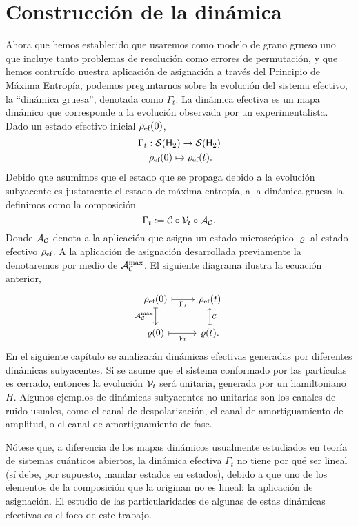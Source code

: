 \section{Construcción de la dinámica}\label{sec:ch2dycon}

Ahora que hemos establecido que usaremos como modelo de grano grueso uno que incluye tanto problemas de resolución como errores de permutación, y que hemos contruído nuestra aplicación de asignación a través del Principio de Máxima Entropía, podemos preguntarnos sobre la evolución del sistema efectivo, la ``dinámica gruesa'', denotada como $\Gamma_t$. La dinámica efectiva es un mapa dinámico que corresponde a la evolución observada por un experimentalista. Dado un estado efectivo inicial $\rho_{\text{ef}}(0)$,
\begin{gather*}
\Gamma_{t}:\mcS(\hilbert_2)\rightarrow \mcS(\hilbert_2)\\
\rho_{\ef}(0) \mapsto \rho_{\ef}(t)\rlap{.}
\end{gather*}
Debido que asumimos que el estado que se propaga debido a la evolución subyacente es justamente el estado de máxima entropía, a la dinámica gruesa la definimos como la composición
\begin{equation*}
\Gamma_t:=\mathcal{C} \circ \mathcal{V}_t \circ \mathcal{A}_{\mathcal{C}}.
\end{equation*}
Donde $\mathcal{A}_{\mathcal{C}}$ denota a la aplicación que asigna un estado microscópico $\varrho$ al estado efectivo $\rho_{\text{ef}}$. A la aplicación de asignación desarrollada previamente la denotaremos por medio de $\mathcal{A}_{\mathcal{C}}^{\max}$. El siguiente diagrama ilustra la ecuación anterior,
\[\begin{tikzcd}[arrows={<-|}]
    \rho_{\ef}(0)  & \rho_{\ef}(t) \arrow{l}{\Gamma_{t}} \arrow{d}{\mcC}\\
\varrho(0) \arrow{u}{\mcA_{\mcC}^{\max}} & \varrho(t). \arrow{l}{\mcV_{t}}
\end{tikzcd}
\]
En el siguiente capítulo se analizarán dinámicas efectivas generadas por diferentes dinámicas subyacentes. Si se asume que el sistema conformado por las partículas es cerrado, entonces la evolución $\mathcal{V}_{t}$ será unitaria, generada por un hamiltoniano $H$. Algunos ejemplos de dinámicas subyacentes no unitarias son los canales de ruido usuales, como el canal de despolarización, el canal de amortiguamiento de amplitud, o el canal de amortiguamiento de fase.

Nótese que, a diferencia de los mapas dinámicos usualmente estudiados en teoría de sistemas cuánticos abiertos, la dinámica efectiva $\Gamma_{t}$ no tiene por qué ser lineal (sí debe, por supuesto, mandar estados en estados), debido a que uno de los elementos de la composición que la originan no es lineal: la aplicación de asignación. El estudio de las particularidades de algunas de estas dinámicas efectivas es el foco de este trabajo.

